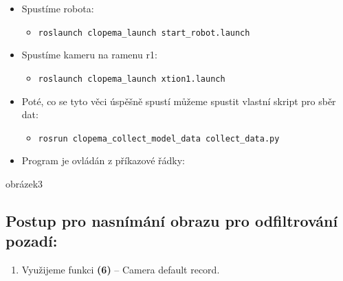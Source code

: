 \documentclass[10pt,a4paper,titlepage,oneside]{book}
\begin{document}
\begin{itemize}
  \item Spustíme robota: 
  \begin{itemize} 
  
  	\item \verb|roslaunch clopema_launch start_robot.launch|
  \end{itemize}
  
  \item Spustíme kameru na ramenu r1:
  \begin{itemize}
  	\item \verb|roslaunch clopema_launch xtion1.launch|
  \end{itemize}
  
  \item Poté, co se tyto věci úspěšně spustí můžeme spustit vlastní skript pro sběr dat:
  \begin{itemize}
  	\item \verb|rosrun clopema_collect_model_data collect_data.py|
  \end{itemize}
  
  \item Program je ovládán z příkazové řádky:
  
\end{itemize}


obrázek3 \\

\subsection*{Postup pro nasnímání obrazu pro odfiltrování pozadí:}
\begin{enumerate}
  \item Využijeme funkci \textbf{(6)} – Camera default record.
\end{enumerate}
\end{document}
